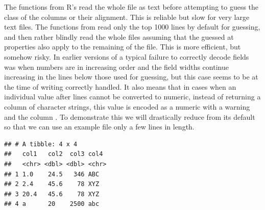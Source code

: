 \documentclass[krantz2]{krantz}\usepackage{knitr}%
\begin{document}
\begin{explainbox}
The functions from R's  read the whole file as text before attempting to guess the class of the columns or their alignment. This is reliable but slow for very large text files. The functions from  read only the top 1000 lines by default for guessing, and then rather blindly read the whole files assuming that the guessed at properties also apply to the remaining of the file. This is more efficient, but somehow risky. In earlier versions of  a typical failure to correctly decode fields was when numbers are in increasing order and the field widths continue increasing in the lines below those used for guessing, but this case seems to be at the time of writing correctly handled. It also means that in cases when an individual value after  lines cannot be converted to numeric, instead of returning a column of character strings, this value is encoded as a numeric  with a warning and the column . To demonstrate this we will drastically reduce  from its default so that we can use an example file only a few lines in length.

\begin{knitrout}\footnotesize
{}\color{fgcolor}\begin{kframe}
\begin{alltt}
\hlstd{(} \hlstd{=} \hlstd{)}
\end{alltt}


{\ttfamily\noindent\itshape\color{messagecolor}{\#\# Parsed with column specification:\\\#\# cols(\\\#\#\ \  col1 = col\_character(),\\\#\#\ \  col2 = col\_double(),\\\#\#\ \  col3 = col\_double(),\\\#\#\ \  col4 = col\_character()\\\#\# )}}\begin{verbatim}
## # A tibble: 4 x 4
##   col1   col2  col3 col4 
##   <chr> <dbl> <dbl> <chr>
## 1 1.0    24.5   346 ABC  
## 2 2.4    45.6    78 XYZ  
## 3 20.4   45.6    78 XYZ  
## 4 a      20    2500 abc
\end{verbatim}
\end{kframe}
\end{knitrout}


\end{explainbox}
\end{document}
